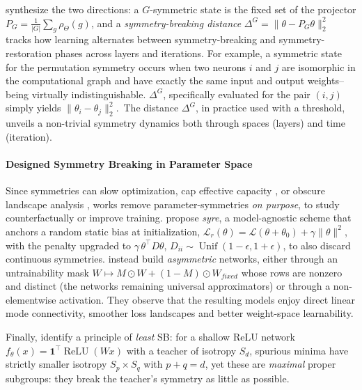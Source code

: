 \documentclass[mathematics,review,submit,moreauthors]{Definitions/mdpi}
\begin{document}
\citet{ziyin2025} synthesize the two directions: a $G$-symmetric state is the fixed set of the projector $P_G=\frac{1}{|G|}\sum_g\rho_\Theta(g)$, and a \emph{symmetry-breaking distance} $\Delta^G=\|\theta-P_G\theta\|_2^2$ tracks how learning alternates between symmetry-breaking \citep{ziyin2025a} and symmetry-restoration \citep{ziyin2024} phases across layers and iterations.
For example, a symmetric state for the permutation symmetry occurs when two neurons $i$ and $j$ are isomorphic in the computational graph and have exactly the same input and output weights--being virtually indistinguishable.
$\Delta^G$, specifically evaluated for the pair $(i,j)$ simply yields $\| \theta_i - \theta_j \|_2^2$.\
The distance $\Delta^G$, in practice used with a threshold, unveils a non-trivial symmetry dynamics both through spaces (layers) and time (iteration).

\paragraph{Designed Symmetry Breaking in Parameter Space}
Since symmetries can slow optimization, cap effective capacity \citep{ziyin2024b}, or obscure landscape analysis \citep{lim2024}, works remove parameter-symmetries \emph{on purpose}, to study counterfactually or improve training.
\citet{ziyin2024b} propose \emph{syre}, a model-agnostic scheme that anchors a random static bias at initialization, $\mathcal{L}_r(\theta)=\mathcal{L}(\theta+\theta_0)+\gamma\|\theta\|^2$, with the penalty upgraded to $\gamma\,\theta^\top D\theta$, $D_{ii}\sim\operatorname{Unif}(1-\epsilon,1+\epsilon)$, to also discard continuous symmetries.
\citet{lim2024} instead build \emph{asymmetric} networks, either through an untrainability mask $W\mapsto M\odot W+(1-M)\odot W_{fixed}$ whose rows are nonzero and distinct (the networks remaining universal approximators) or through a non-elementwise activation.
They observe that the resulting models enjoy direct linear mode connectivity, smoother loss landscapes and better weight-space learnability.

\vspace{5mm}

Finally, \citet{arjevani2023} identify a principle of \emph{least} SB: for a shallow ReLU network $f_\theta(x)=\mathbf 1^\top\operatorname{ReLU}(Wx)$ with a teacher of isotropy $S_d$, spurious minima have strictly smaller isotropy $S_p\times S_q$ with $p+q=d$, yet these are \emph{maximal} proper subgroups: they break the teacher's symmetry as little as possible.
\end{document}
